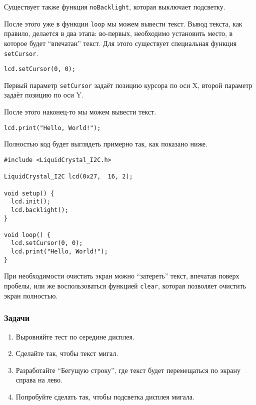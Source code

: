 \documentclass[../sparc.tex]{subfiles}
\begin{document}
Существует также функция \texttt{noBacklight}, которая выключает подсветку.

После этого уже в функции \texttt{loop} мы можем вывести текст.  Вывод текста,
как правило, делается в два этапа: во-первых, необходимо установить место, в
которое будет ``впечатан'' текст.  Для этого существует специальная функция
\texttt{setCursor}.

\begin{verbatim}
lcd.setCursor(0, 0);
\end{verbatim}

Первый параметр \texttt{setCursor} задаёт позицию курсора по оси X, второй
параметр задаёт позицию по оси Y.

После этого наконец-то мы можем вывести текст.

\begin{verbatim}
lcd.print("Hello, World!");
\end{verbatim}

Полностью код будет выглядеть примерно так, как показано ниже.

\begin{verbatim}
#include <LiquidCrystal_I2C.h>

LiquidCrystal_I2C lcd(0x27,  16, 2);

void setup() {
  lcd.init();
  lcd.backlight();
}

void loop() {
  lcd.setCursor(0, 0);
  lcd.print("Hello, World!");
}
\end{verbatim}

При необходимости очистить экран можно ``затереть'' текст, впечатав поверх
пробелы, или же воспользоваться функцией \texttt{clear}, которая позволяет
очистить экран полностью.

\subsubsection{Задачи}
\begin{enumerate}
\item Выровняйте тест по середине дисплея.
\item Сделайте так, чтобы текст мигал.
\item Разработайте ``Бегущую строку'', где текст будет перемещаться по экрану
  справа на лево.
\item Попробуйте сделать так, чтобы подсветка дисплея мигала.
\end{enumerate}
\end{document}
